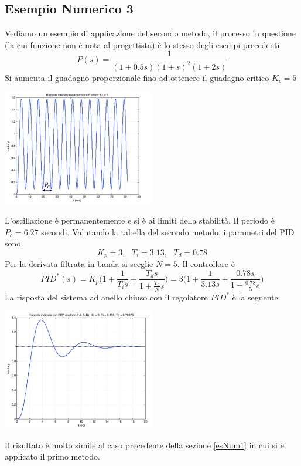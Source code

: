 \documentclass[10pt, letterpaper]{report}
\begin{document}
\subsection{Esempio Numerico 3}
Vediamo un esempio di applicazione del secondo metodo, il processo in questione (la cui funzione non è nota al progettista) è lo stesso degli esempi precedenti 
$$P(s)=\frac{1}{(1+0.5s)(1+s)^2(1+2s)}$$
Si aumenta il guadagno proporzionale fino ad ottenere il guadagno critico $K_c=5$
\begin{center}
    \includegraphics[width=0.5\textwidth]{images/2ZN2.png}
\end{center}
L'oscillazione è permanentemente e si è ai limiti della stabilità. Il periodo è $P_c=6.27$ secondi. Valutando la tabella del secondo metodo, i parametri del PID sono 
$$K_p=3,\ \ \ T_i=3.13, \ \ \ T_d=0.78 $$
Per la derivata filtrata in banda si sceglie $N=5$. Il controllore è 
$$ PID^*(s)=
K_p\Big(1+\frac{1}{T_i s}+\dfrac{T_d s}{1+\frac{T_d}{N}s}\Big)= 
3\Big(1+\frac{1}{3.13 s}+\dfrac{0.78 s}{1+\frac{0.78}{5}s}\Big)
$$
La risposta del sistema ad anello chiuso con il regolatore $PID^*$ è la seguente 
\begin{center}
    \includegraphics[width=0.5\textwidth]{images/2ZN3.png}
\end{center}
Il risultato è molto simile al caso precedente della sezione \ref{esNum1} in cui si è applicato il primo metodo.
\end{document}
